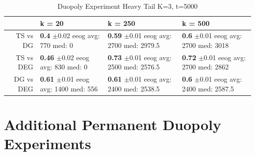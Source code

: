 \documentclass[11pt,letterpaper]{article}
\begin{document}
\begin{table}[H]
\centering
\caption{Duopoly Experiment Heavy Tail K=3, t=5000} 
\begin{tabular}{rlll}
  \hline
 & k = 20 & k = 250 & k = 500 \\ 
  \hline
TS vs DG & \makecell{\textbf{0.4} $\pm$0.02\\ eeog \\ avg: 770\\ med: 0} & \makecell{\textbf{0.59} $\pm$0.01\\ eeog \\ avg: 2700\\ med: 2979.5} & \makecell{\textbf{0.6} $\pm$0.01\\ eeog \\ avg: 2700\\ med: 3018} \\ 
  TS vs DEG & \makecell{\textbf{0.46} $\pm$0.02\\ eeog \\ avg: 830\\ med: 0} & \makecell{\textbf{0.73} $\pm$0.01\\ eeog \\ avg: 2500\\ med: 2576.5} & \makecell{\textbf{0.72} $\pm$0.01\\ eeog \\ avg: 2700\\ med: 2862} \\ 
  DG vs DEG & \makecell{\textbf{0.61} $\pm$0.01\\ eeog \\ avg: 1400\\ med: 556} & \makecell{\textbf{0.61} $\pm$0.01\\ eeog \\ avg: 2400\\ med: 2538.5} & \makecell{\textbf{0.6} $\pm$0.01\\ eeog \\ avg: 2400\\ med: 2587.5} \\ 
   \hline
\end{tabular}
\end{table}

\section{Additional Permanent Duopoly Experiments}
\end{document}
